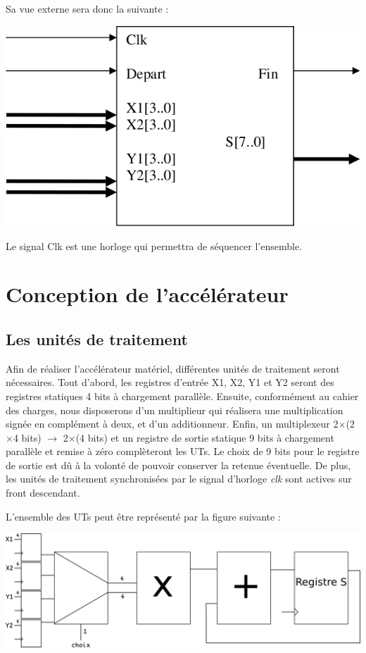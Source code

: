 \documentclass[a4paper]{report}
\begin{document}
Sa vue externe sera donc la suivante :

\begin{center}
	\includegraphics[scale=0.3]{veprod.png}
\end{center}

Le signal Clk est une horloge qui permettra de séquencer l’ensemble.

\chapter{Conception de l'accélérateur}
\section{Les unités de traitement}
Afin de réaliser l'accélérateur matériel, différentes unités de traitement seront nécessaires.
Tout d'abord, les registres d'entrée X1, X2, Y1 et Y2 seront des registres statiques 4 bits à chargement parallèle.
Ensuite, conformément au cahier des charges, nous disposerons d'un multiplieur qui réalisera une multiplication signée en complément à deux, et d'un additionneur.
Enfin, un multiplexeur 2$\times$(2$\times$4 bits) $\rightarrow$ 2$\times$(4 bits) et un registre de sortie statique 9 bits à chargement parallèle et remise à zéro complèteront les UTs.
Le choix de 9 bits pour le registre de sortie est dû à la volonté de pouvoir conserver la retenue éventuelle.
De plus, les unités de traitement synchronisées par le signal d'horloge \emph{clk} sont actives sur front descendant.

L'ensemble des UTs peut être représenté par la figure suivante :

\begin{center}
	\includegraphics[scale=0.5]{uts.png}
\end{center}
\end{document}
